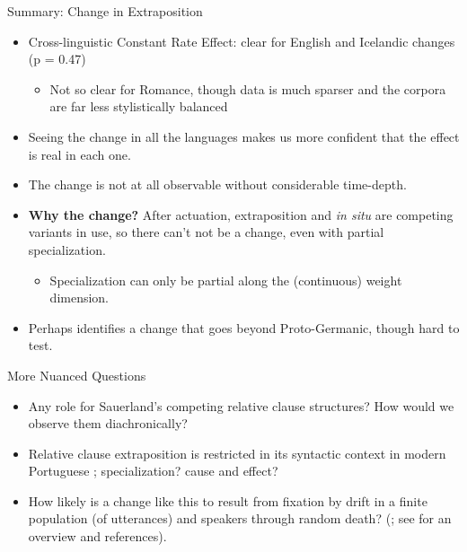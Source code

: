 \documentclass[hyperref={pdfpagelabels=false}]{beamer}
\begin{document}
\begin{frame}{Summary: Change in Extraposition}

\begin{itemize}

	\item Cross-linguistic Constant Rate Effect: clear for English and Icelandic changes (p = 0.47)
		\begin{itemize} \item Not so clear for Romance, though data is much sparser and the corpora are far less stylistically balanced \end{itemize}
	\item Seeing the change in all the languages makes us more confident that the effect is real in each one.
	\item The change is not at all observable without considerable time-depth.
	\item \textbf{Why the change?} After actuation, extraposition and \textsl{in situ} are competing variants in use, so there can't not be a change, even with partial specialization.
		\begin{itemize}
		\item Specialization can only be partial along the (continuous) weight dimension.
		\end{itemize}
\item Perhaps \citet{kiparsky1995} identifies a change that goes beyond Proto-Germanic, though hard to test.
\end{itemize}

\end{frame}


\begin{frame}{More Nuanced Questions}
\begin{itemize}
	\item Any role for Sauerland's competing relative clause structures? How would we observe them diachronically?
	\item Relative clause extraposition is restricted in its syntactic context in modern Portuguese \citep{cardoso2011, cardoso2012}; specialization? cause and effect?
	\item How likely is a change like this to result from fixation by drift in a finite population (of utterances) and speakers through random death? (\citealt{moran1958}; see \citealt{nowak2006} for an overview and references).
\end{itemize}
\end{frame}
\end{document}
